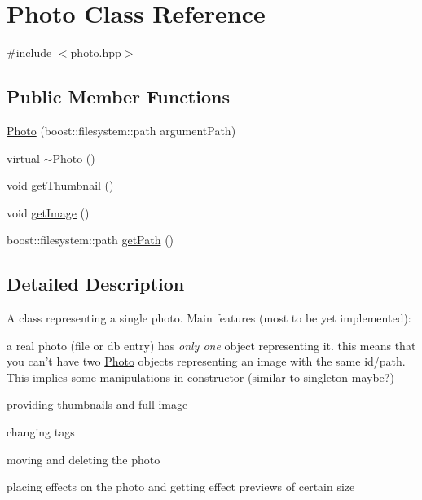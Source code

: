 \hypertarget{classPhoto}{\section{Photo Class Reference}
\label{classPhoto}
}


{\ttfamily \#include $<$photo.\-hpp$>$}

\subsection*{Public Member Functions}
\begin{DoxyCompactItemize}
\item 
\hyperlink{classPhoto_ae30ff25941bf9aba469eb08f838a666a}{Photo} (boost\-::filesystem\-::path argument\-Path)
\item 
virtual \hyperlink{classPhoto_a1bf707fc71f95a3aa3464bd4e339afd0}{$\sim$\-Photo} ()
\item 
void \hyperlink{classPhoto_a8e86e62d0ac46bf94e16391a373a4abc}{get\-Thumbnail} ()
\item 
void \hyperlink{classPhoto_a9796448b191e7696f9024a86fa4d02c9}{get\-Image} ()
\item 
boost\-::filesystem\-::path \hyperlink{classPhoto_ab369ad720923dda4db65996cd2844859}{get\-Path} ()
\end{DoxyCompactItemize}


\subsection{Detailed Description}
A class representing a single photo. Main features (most to be yet implemented)\-:
\begin{DoxyItemize}
\item a real photo (file or db entry) has {\itshape only one\/} object representing it. this means that you can't have two \hyperlink{classPhoto}{Photo} objects representing an image with the same id/path. This implies some manipulations in constructor (similar to singleton maybe?)
\item providing thumbnails and full image
\item changing tags
\item moving and deleting the photo
\item placing effects on the photo and getting effect previews of certain size 
\end{DoxyItemize}

